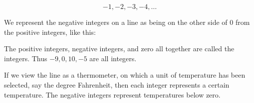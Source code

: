 \documentclass[paper=a4,oneside,fontsize=12pt, parskip=full]{scrartcl}
\begin{document}
    \[-1,-2,-3,-4,\dots\]

    We represent the negative integers on a line as being on the other side of 0
    from the positive integers, like this:

    \begin{center}
    \end{center}

    The positive integers, negative integers, and zero all together are called the integers.
    Thus $-9, 0, 10, -5$ are all integers.

    If we view the line as a thermometer, on which a unit of temperature has
    been selected, say the degree Fahrenheit, then each integer represents a certain temperature.
    The negative integers represent temperatures below zero.
\end{document}

